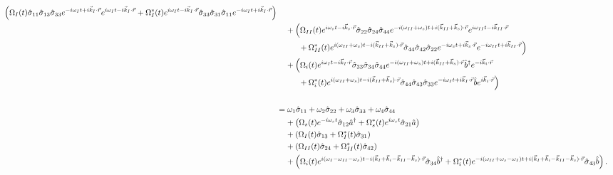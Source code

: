 \documentclass[aps,pra,showpacs,amsmath,amssymb,nofootinbib,longbibliography,superscriptaddress
]{revtex4-1}
\theoremstyle{definition}
\theoremstyle{remark}
\newcommand{\0}{\hat{0}}
\begin{document}
\begin{align}
    \left(
        \Omega_{I}(t) \hat{\sigma}_{11} \hat{\sigma}_{13} \hat{\sigma}_{33} e^{-i \omega_I t + i \vec{k}_I \cdot \vec{r}} e^{i \omega_I t - i \vec{k}_I \cdot \vec{r}} +
        \Omega_{I}^*(t) e^{i \omega_I t - i \vec{k}_I \cdot \vec{r}} \hat{\sigma}_{33} \hat{\sigma}_{31} \hat{\sigma}_{11} e^{-i \omega_I t + i \vec{k}_I \cdot \vec{r}}
    \right)\nonumber \\
    &\;\;\;\;+
    \Bigl(
        \Omega_{II}(t) e^{i \omega_s t - i \vec{k}_s \cdot \vec{r}} \hat{\sigma}_{22} \hat{\sigma}_{24} \hat{\sigma}_{44} e^{-i(\omega_{II} + \omega_s) t + i(\vec{k}_{II} + \vec{k}_s) \cdot \vec{r}} e^{i \omega_{II} t - i \vec{k}_{II} \cdot \vec{r}} \nonumber \\
    &\;\;\;\;\;\;\;\;\;\;+
        \Omega_{II}^*(t) e^{i(\omega_{II} + \omega_s) t - i(\vec{k}_{II} + \vec{k}_s) \cdot \vec{r}} \hat{\sigma}_{44} \hat{\sigma}_{42} \hat{\sigma}_{22} e^{-i \omega_s t + i \vec{k}_s \cdot \vec{r}} e^{-i \omega_{II} t + i \vec{k}_{II} \cdot \vec{r}}
    \Bigr)\nonumber \\
    &\;\;\;\;+ 
    \Bigl(
        \Omega_{i}(t) e^{i \omega_I t - i \vec{k}_I \cdot \vec{r}} \hat{\sigma}_{33} \hat{\sigma}_{34} \hat{\sigma}_{44} e^{-i(\omega_{II} + \omega_s) t + i(\vec{k}_{II} + \vec{k}_s) \cdot \vec{r}} \hat{b}^{\dagger} e^{-i \vec{k}_{i} \cdot \vec{r}} \nonumber \\
    &\;\;\;\;\;\;\;\;\;\;+
        \Omega_{i}^*(t) e^{i(\omega_{II} + \omega_s) t - i(\vec{k}_{II} + \vec{k}_s) \cdot \vec{r}} \hat{\sigma}_{44} \hat{\sigma}_{43} \hat{\sigma}_{33} e^{-i \omega_I t + i \vec{k}_I \cdot \vec{r}} \hat{b} e^{i \vec{k}_{i} \cdot \vec{r}}
    \Bigr)\nonumber \\ \nonumber \\
    &=
    \omega_1 \hat{\sigma}_{11} + \omega_2 \hat{\sigma}_{22} + \omega_3 \hat{\sigma}_{33} + \omega_4 \hat{\sigma}_{44} \nonumber \\
    &\;\;\;\;+
    \left(
        \Omega_{s}(t) e^{-i \omega_s t} \hat{\sigma}_{12} \hat{a}^{\dagger} +
        \Omega_{s}^*(t) e^{i \omega_s t} \hat{\sigma}_{21} \hat{a}
    \right)\nonumber \\
    &\;\;\;\;+
    \left(
        \Omega_{I}(t) \hat{\sigma}_{13} +
        \Omega_{I}^*(t) \hat{\sigma}_{31}
    \right)\nonumber \\
    &\;\;\;\;+
    \left(
        \Omega_{II}(t) \hat{\sigma}_{24} +
        \Omega_{II}^*(t) \hat{\sigma}_{42}
    \right)\nonumber \\
    &\;\;\;\;+
    \left(
        \Omega_{i}(t) e^{i(\omega_I - \omega_{II} - \omega_s) t - i(\vec{k}_I + \vec{k}_{i} - \vec{k}_{II} - \vec{k}_s) \cdot \vec{r}} \hat{\sigma}_{34} \hat{b}^{\dagger} +
        \Omega_{i}^*(t) e^{-i(\omega_{II} + \omega_s - \omega_I) t + i(\vec{k}_I + \vec{k}_{i} - \vec{k}_{II} - \vec{k}_s) \cdot \vec{r}} \hat{\sigma}_{43} \hat{b}
    \right).
\end{align}
\end{document}
